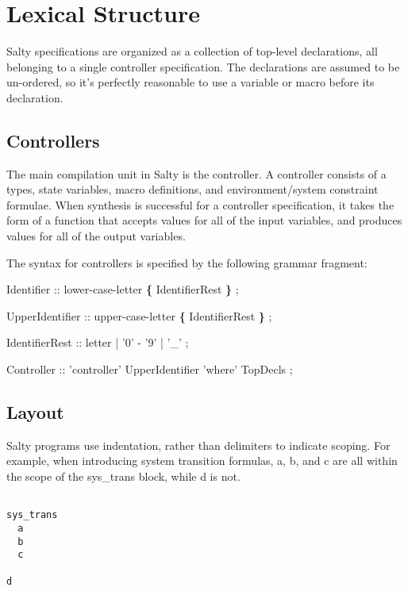 
\section{Lexical Structure}

Salty specifications are organized as a collection of top-level declarations, all 
belonging to a single controller specification. The declarations are assumed to be 
un-ordered, so it's perfectly reasonable to use a variable or macro before its 
declaration.

\subsection{Controllers}

The main compilation unit in Salty is the controller. A controller consists of a 
types, state variables, macro definitions, and environment/system constraint formulae. 
When synthesis is successful for a controller specification, it takes the form of a 
function that accepts values for all of the input variables, and produces values for 
all of the output variables.

\noindent The syntax for controllers is specified by the following grammar fragment:

\begin{Grammar}
  Identifier      :: lower-case-letter \textbf{\{} IdentifierRest \textbf{\}} ;

  UpperIdentifier :: upper-case-letter \textbf{\{} IdentifierRest \textbf{\}} ;

  IdentifierRest  :: letter | '0' - '9' | '_' ;

  Controller      :: 'controller' UpperIdentifier 'where' TopDecls ;
\end{Grammar}

\newpage

\subsection{Layout}

Salty programs use indentation, rather than delimiters to indicate scoping. 
For example, when introducing system transition formulas, a, b, and c are all 
within the scope of the sys\_trans block, while d is not.

\begin{lstlisting}

sys_trans
  a
  b
  c

d

\end{lstlisting}

